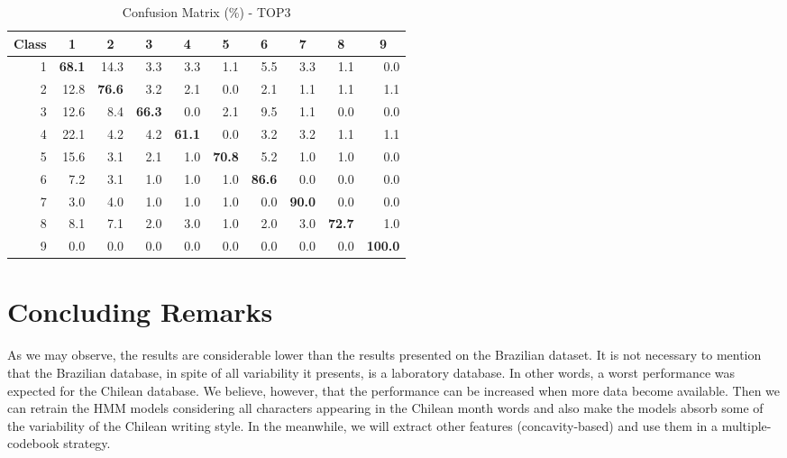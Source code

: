 \documentclass{article}[14pt, oneside, a4paper, times]
\begin{document}
\begin{table} [ht!]
\caption {Confusion Matrix (\%) - TOP3}
\begin{center}
\begin{tabular}{rrrrrrrrrr} \hline 
 \multicolumn{1}{c}{Class}&
 \multicolumn{1}{c}{1}&
 \multicolumn{1}{c}{2}&
 \multicolumn{1}{c}{3}&
 \multicolumn{1}{c}{4}&
 \multicolumn{1}{c}{5}&
 \multicolumn{1}{c}{6}&
 \multicolumn{1}{c}{7}&
 \multicolumn{1}{c}{8}&
 \multicolumn{1}{c}{9} \\ \hline

1 & \textbf{68.1}	&	14.3&	3.3	&	3.3	&	1.1	&	5.5	&	3.3	&	1.1	&	0.0\\
2 & 12.8	&	\textbf{76.6}&	3.2	&	2.1	&	0.0	&	2.1	&	1.1	&	1.1	&	1.1\\
3 & 12.6	&	8.4	&	\textbf{66.3}&	0.0	&	2.1	&	9.5	&	1.1	&	0.0	&	0.0\\
4 & 22.1	&	4.2	&	4.2	&	\textbf{61.1}	&	0.0	&	3.2	&	3.2	&	1.1	&	1.1\\
5 & 15.6	&	3.1	&	2.1	&	1.0	&	\textbf{70.8}	&	5.2	&	1.0	&	1.0	&	0.0\\
6 & 7.2 	&	3.1	&	1.0	&	1.0	&	1.0	&	\textbf{86.6}	&	0.0	&	0.0	&	0.0\\
7 & 3.0 	&	4.0	&	1.0	&	1.0	&	1.0	&	0.0	&	\textbf{90.0}	&	0.0	&	0.0\\
8 & 8.1 	&	7.1	&	2.0	&	3.0	&	1.0	&	2.0	&	3.0	&	\textbf{72.7}	&	1.0\\
9 & 0.0 	&	0.0	&	0.0	&	0.0	&	0.0	&	0.0	&	0.0	&	0.0	&	\textbf{100.0}\\ \hline

\end{tabular}
\label{top3:tab}
\end{center}
\end{table}

\section{Concluding Remarks}

As we may observe, the results are considerable lower than the results presented on the Brazilian dataset. It is not necessary to mention that the Brazilian database, in spite of all variability it presents, is a laboratory database. In other words, a worst performance was expected for the Chilean database. We believe, however, that the performance can be increased when more data become available. Then we can retrain the HMM models considering all characters appearing in the Chilean month words and also make the models absorb some of the variability of the Chilean writing style. In the meanwhile, we will extract other features (concavity-based) and use them in a multiple-codebook strategy.
\end{document}
